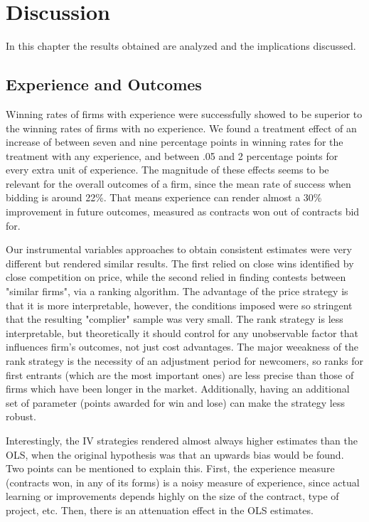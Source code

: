 \chapter{Discussion}

In this chapter the results obtained are analyzed and the implications discussed.

\section{Experience and Outcomes}
Winning rates of firms with experience were successfully showed to be superior to the winning rates  of firms with no experience. We found a treatment effect of an increase of between seven and nine percentage points in winning rates for the treatment with any experience, and between .05 and 2 percentage points for every extra unit of experience. The magnitude of these effects seems to be relevant for the overall outcomes of a firm, since the mean rate of success when bidding is around 22\%. That means experience can render almost a 30\% improvement in future outcomes, measured as contracts won out of contracts bid for.

Our instrumental variables approaches to obtain consistent estimates were very different but rendered similar results. The first relied on close wins identified by close competition on price, while the second relied in finding contests between "similar firms", via a ranking algorithm. The advantage of the price strategy is that it is more interpretable, however, the conditions imposed were so stringent that the resulting "complier" sample was very small. The rank strategy is less interpretable, but theoretically it should control for any unobservable factor that influences firm's outcomes, not just cost advantages. The major weeakness of the rank strategy is the necessity of an adjustment period for newcomers, so ranks for first entrants (which are the most important ones) are less precise than those of firms which have been longer in the market. Additionally, having an additional set of parameter (points awarded for win and lose) can make the strategy less  robust.

Interestingly, the IV strategies rendered almost always higher estimates than the OLS, when the original hypothesis was that an upwards bias would be found. Two points can be mentioned to explain this. First, the experience measure (contracts won, in any of its forms) is a noisy measure of experience, since actual learning or improvements depends highly on the size of the contract, type of project, etc. Then, there is an attenuation effect in the OLS estimates.

